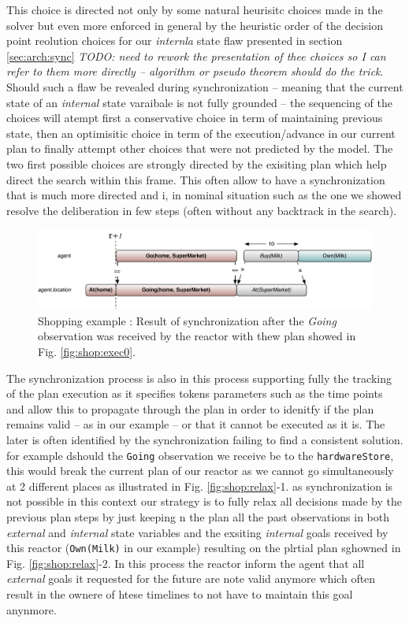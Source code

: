 This choice is directed not only by some natural heurisitc choices
made in the solver but even more enforced in general by the heuristic
order of the decision point reolution choices for our {\em internla}
state flaw presented in section \ref{sec:arch:sync} {\em\color{red}
  TODO: need to rework the presentation of thee choices so I can refer
  to them more directly -- algorithm or pseudo theorem should do the
  trick}. Should such a flaw be revealed during synchronization --
meaning that the current state of an {\em internal} state varaibale is
not fully grounded -- the sequencing of the choices will atempt first
a conservative choice in term of maintaining previous state, then an
optimisitic choice in term of the execution/advance in our current
plan to finally attempt other choices that were not predicted by the
model. The two first possible choices are strongly directed by the
exisiting plan which help direct the search within this frame. This
often allow to have a synchronization that is much more directed and
i, in nominal situation such as the one we showed resolve the
deliberation in few steps (often without any backtrack in the search).

\begin{figure}[!htb]
  \centering
  \includegraphics[width=0.7\columnwidth]{figs/shoping_exec_t1}
  \caption{Shopping example : Result of synchronization after the {\em
      Going} observation was received by the reactor with thew plan
    showed in Fig. \ref{fig:shop:exec0}.}
  \label{fig:shop:exec1}
\end{figure}

The synchronization process is also in this process supporting fully
the tracking of the plan execution as it specifies tokens parameters
such as the time points and allow this to propagate through the plan
in order to idenitfy if the plan remains valid -- as in our example --
or that it cannot be executed as it is. The later is often identified
by the synchronization failing to find a consistent solution. for
example dshould the \texttt{Going} observation we receive be to the
\texttt{hardwareStore}, this would break the current plan of our
reactor as we cannot go simultaneously at 2 different places as
illustrated in Fig. \ref{fig:shop:relax}-1. as synchronization is not
possible in this context our strategy is to fully relax all decisions
made by the previous plan steps by just keeping n the plan all the
past observations in both {\em external} and {\em internal} state
variables and the exsiting {\em internal} goals received by this
reactor (\texttt{Own(Milk)} in our example) resulting on the plrtial
plan sghowned in Fig. \ref{fig:shop:relax}-2. In this process the
reactor inform the agent that all {\em external} goals it requested
for the future are note valid anymore which often result in the ownere
of htese timelines to not have to maintain this goal anynmore.

